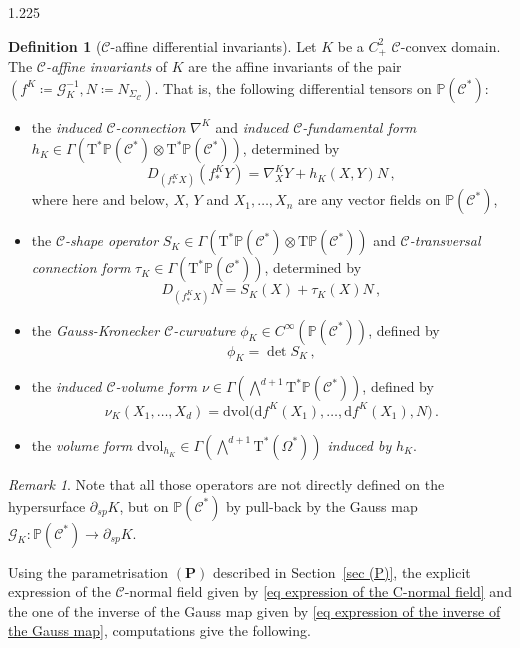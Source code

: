 \documentclass[reqno, a4paper]{amsart}
\numberwithin{equation}{section}
\numberwithin{figure}{section}
\theoremstyle{definition}
\newtheorem{definition}[theorem]{Definition}
\theoremstyle{remark}
\newtheorem{remark}[theorem]{Remark}
\renewcommand{\P}{\mathbb{P}} %
\newcommand{\dif}{\mathrm{d}} %
\newcommand{\C}{\mathcal{C}} %
\renewcommand{\S}{\Sigma_\C} %
\newcommand{\G}{\mathcal{G}} %
\newcommand{\dvol}{\dif \mathrm{vol}} %
\newcommand{\bp}[1]{{\bigl( {#1} \bigr)}} %
\begin{document}
\begin{spacing}{1.225}
\begin{definition}[$\C$-affine differential invariants]
\label{def C-invariants}
Let $K$ be a $C^2_+$ $\C$-convex domain. The \emph{$\C$-affine invariants} of $K$ are the affine invariants of the pair $(f^K \coloneqq \G_K^{-1} , N \coloneqq N_{\S})$. That is, the following differential tensors on $\P(\C^*)$:
\begin{itemize}
\item the \emph{induced $\C$-connection} $\nabla^K$ and \emph{induced $\C$-fundamental form} $h_K \in \Gamma(\mathrm{T}^*\P(\C^*) \otimes \mathrm{T}^*\P(\C^*))$, determined by
\begin{equation*}
D_{(f^K_*X)} (f^K_*Y) =\nabla^K_X Y + h_K(X,Y) N \, ,
\end{equation*}
where here and below, $X$, $Y$ and $X_1,\dots, X_n$ are any vector fields on $\P(\C^*)$,
\item the \emph{$\C$-shape operator} $S_K \in \Gamma(\mathrm{T}^*\P(\C^*) \otimes \mathrm{T}\P(\C^*))$ and \emph{$\C$-transversal connection form} $\tau_K \in \Gamma(\mathrm{T}^*\P(\C^*))$, determined by 
\begin{equation*}
D_{(f^K_*X)} N =S_K(X) + \tau_K(X) N \, ,
\end{equation*}
\item the \emph{Gauss-Kronecker $\C$-curvature} $\phi_K \in C^\infty(\P(\C^*))$, defined by
\begin{equation*}
\phi_K = \det S_K \, ,
\end{equation*}
\item the \emph{induced $\C$-volume form $\nu \in \Gamma(\bigwedge^{d+1}\mathrm{T}^*\P(\C^*))$}, defined by 
\begin{equation*}
\nu_K(X_1, \dots, X_d) = \dvol \bp{ \dif f^K(X_1), \dots, \dif f^K(X_1),N} \, . 
\end{equation*}
\item the \emph{volume form $\dvol_{h_K} \in \Gamma(\bigwedge^{d+1}\mathrm{T}^*(\Omega^*))$ induced by} $h_K$. 
\end{itemize} 
\end{definition}

\begin{remark}
Note that all those operators are not directly defined on the hypersurface $\partial_{sp}K$, but on $\P(\C^*)$ by pull-back by the Gauss map $\G_K : \P(\C^*) \to \partial_{sp}K$. 
\end{remark}

Using the parametrisation $(\mathbf{P})$ described in Section~\ref{sec (P)}, the explicit expression of the $\C$-normal field given by \eqref{eq expression of the C-normal field} and the one of the inverse of the Gauss map given by \eqref{eq expression of the inverse of the Gauss map}, computations \cite[proof of Proposition~7.1]{Nie_Seppi_22} give the following. 


\end{spacing}
\end{document}
